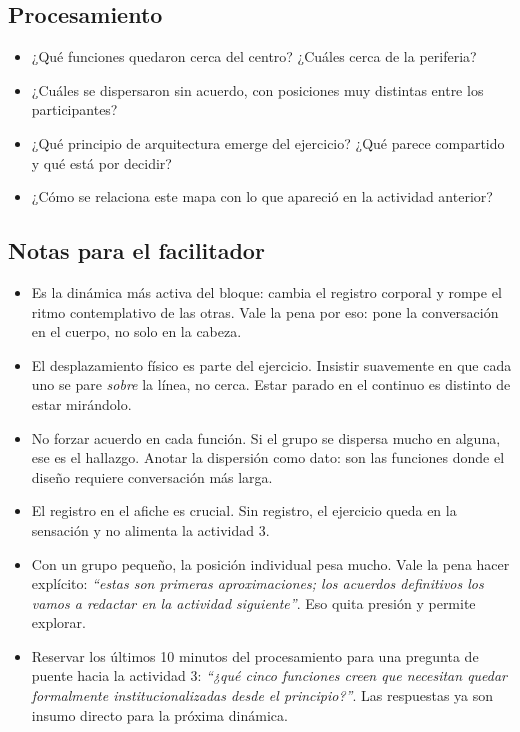 \documentclass[11pt, a4paper]{article}
\begin{document}
\begin{actividad}
\subsection*{Procesamiento}
\begin{itemize}
  \item ¿Qué funciones quedaron cerca del centro? ¿Cuáles cerca de la periferia?
  \item ¿Cuáles se dispersaron sin acuerdo, con posiciones muy distintas entre los participantes?
  \item ¿Qué principio de arquitectura emerge del ejercicio? ¿Qué parece compartido y qué está por decidir?
  \item ¿Cómo se relaciona este mapa con lo que apareció en la actividad anterior?
\end{itemize}

\subsection*{Notas para el facilitador}
\begin{itemize}
  \item Es la dinámica más activa del bloque: cambia el registro corporal y rompe el ritmo contemplativo de las otras. Vale la pena por eso: pone la conversación en el cuerpo, no solo en la cabeza.
  \item El desplazamiento físico es parte del ejercicio. Insistir suavemente en que cada uno se pare \emph{sobre} la línea, no cerca. Estar parado en el continuo es distinto de estar mirándolo.
  \item No forzar acuerdo en cada función. Si el grupo se dispersa mucho en alguna, ese es el hallazgo. Anotar la dispersión como dato: son las funciones donde el diseño requiere conversación más larga.
  \item El registro en el afiche es crucial. Sin registro, el ejercicio queda en la sensación y no alimenta la actividad 3.
  \item Con un grupo pequeño, la posición individual pesa mucho. Vale la pena hacer explícito: \emph{``estas son primeras aproximaciones; los acuerdos definitivos los vamos a redactar en la actividad siguiente''}. Eso quita presión y permite explorar.
  \item Reservar los últimos 10 minutos del procesamiento para una pregunta de puente hacia la actividad 3: \emph{``¿qué cinco funciones creen que necesitan quedar formalmente institucionalizadas desde el principio?''}. Las respuestas ya son insumo directo para la próxima dinámica.
\end{itemize}

\end{actividad}
\end{document}
